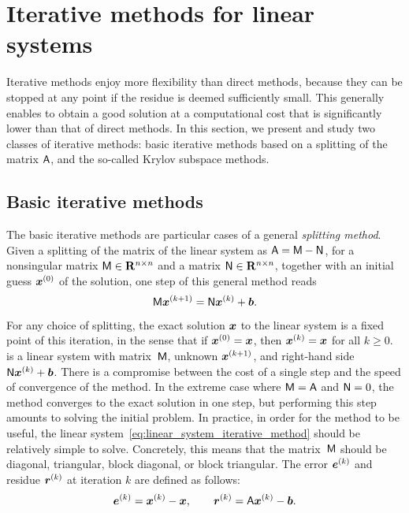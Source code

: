 \section{Iterative methods for linear systems}%
\label{sec:iterative_methods}
Iterative methods enjoy more flexibility than direct methods,
because they can be stopped at any point if the residue is deemed sufficiently small.
This generally enables to obtain a good solution at a computational cost that is significantly lower than that of direct methods.
In this section,
we present and study two classes of iterative methods:
basic iterative methods based on a splitting of the matrix $\mathsf A$,
and the so-called Krylov subspace methods.

\subsection{Basic iterative methods}%
\label{sub:basic_iterative_methods}
The basic iterative methods are particular cases of a general \emph{splitting method}.
Given a splitting of the matrix of the linear system as $\mathsf A = \mathsf M - \mathsf N$,
for a nonsingular matrix $\mathsf M \in \mathbf R^{n \times n}$ and a matrix $\mathsf N \in  \mathbf R^{n \times n}$,
together with an initial guess $\mathbf{\boldsymbol{x}}^{(0)}$ of the solution,
one step of this general method reads
\begin{equation}
    \label{eq:linear_system_iterative_method}
    \mathsf M \mathbf{\boldsymbol{x}}^{(k+1)} = \mathsf N \mathbf{\boldsymbol{x}}^{(k)} + \mathbf{\boldsymbol{b}}.
\end{equation}
For any choice of splitting,
the exact solution $\mathbf{\boldsymbol{x}}$ to the linear system is a fixed point of this iteration,
in the sense that if $\mathbf{\boldsymbol{x}}^{(0)} = \mathbf{\boldsymbol{x}}$, then $\mathbf{\boldsymbol{x}}^{(k)} = \mathbf{\boldsymbol{x}}$ for all $k \geq 0$.
 is a linear system with matrix~$\mathsf M$,
unknown $\mathbf{\boldsymbol{x}}^{(k+1)}$, and right-hand side $\mathsf N \mathbf{\boldsymbol{x}}^{(k)} + \mathbf{\boldsymbol{b}}$.
There is a compromise between the cost of a single step and the speed of convergence of the method.
In the extreme case where $\mathsf M = \mathsf A$ and $\mathsf N = 0$,
the method converges to the exact solution in one step,
but performing this step amounts to solving the initial problem.
In practice, in order for the method to be useful,
the linear system~\eqref{eq:linear_system_iterative_method} should be relatively simple to solve.
Concretely, this means that the matrix~$\mathsf M$ should be diagonal, triangular, block diagonal, or block triangular.
The error $\mathbf{\boldsymbol{e}}^{(k)}$ and residue $\mathbf{\boldsymbol{r}}^{(k)}$ at iteration $k$ are defined as follows:
\[
    \mathbf{\boldsymbol{e}}^{(k)} = \mathbf{\boldsymbol{x}}^{(k)} - \mathbf{\boldsymbol{x}},
    \qquad
    \mathbf{\boldsymbol{r}}^{(k)} = \mathsf A \mathbf{\boldsymbol{x}}^{(k)} - \mathbf{\boldsymbol{b}}.
\]

